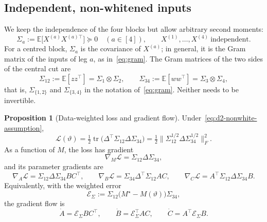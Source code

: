 \documentclass[11pt]{article}
\newcommand{\E}{\mathbb{E}}
\newcommand{\norm}[1]{\lVert #1\rVert}
\theoremstyle{definition}
\newtheorem{proposition}[theorem]{Proposition}
\numberwithin{equation}{section}
\begin{document}
\subsection{Independent, non-whitened inputs}\label{sec:d2-nonwhite}

We keep the independence of the four blocks but allow arbitrary second moments:
\begin{equation}\label{eq:d2-nonwhite-assumption}
\Sigma_a:=\E\big[X^{(a)}X^{(a)\top}\big]\succeq0\quad(a\in[4]),\qquad X^{(1)},\dots,X^{(4)}\ \text{independent}.
\end{equation}
For a centred block, $\Sigma_a$ is the covariance of $X^{(a)}$; in general, it is the Gram matrix of the inputs of leg $a$, as in~\eqref{eq:gram}. The Gram matrices of the two sides of the central cut are
\begin{equation}\label{eq:d2-gram-LR}
\Sigma_{12}:=\E[zz^\top]=\Sigma_1\otimes\Sigma_2,\qquad\Sigma_{34}:=\E[ww^\top]=\Sigma_3\otimes\Sigma_4,
\end{equation}
that is, $\Sigma_{\{1,2\}}$ and $\Sigma_{\{3,4\}}$ in the notation of~\eqref{eq:gram}. Neither needs to be invertible.

\begin{proposition}[Data-weighted loss and gradient flow]\label{prop:d2-nonwhite-flow}
Under~\eqref{eq:d2-nonwhite-assumption},
\begin{equation}\label{eq:d2-nonwhite-loss}
\mathcal L(\vartheta)=\tfrac12\operatorname{tr}\big(\Delta^\top\Sigma_{12}\Delta\Sigma_{34}\big)=\tfrac12\norm{\Sigma_{12}^{1/2}\Delta\Sigma_{34}^{1/2}}_F^2.
\end{equation}
As a function of $M$, the loss has gradient
\begin{equation}\label{eq:d2-coeff-gradient-nonwhite}
\nabla_M\mathcal L=\Sigma_{12}\Delta\Sigma_{34},
\end{equation}
and its parameter gradients are
\begin{equation}\label{eq:d2-nonwhite-gradients}
\nabla_A\mathcal L=\Sigma_{12}\Delta\Sigma_{34}BC^\top,\qquad\nabla_B\mathcal L=\Sigma_{34}\Delta^\top\Sigma_{12}AC,\qquad\nabla_C\mathcal L=A^\top\Sigma_{12}\Delta\Sigma_{34}B.
\end{equation}
Equivalently, with the weighted error
\begin{equation}\label{eq:d2-weighted-error}
\mathcal E_\Sigma:=\Sigma_{12}\big(M^\star-M(\vartheta)\big)\Sigma_{34},
\end{equation}
the gradient flow is
\begin{equation}\label{eq:d2-nonwhite-flow}
\dot A=\mathcal E_\Sigma BC^\top,\qquad\dot B=\mathcal E_\Sigma^\top AC,\qquad\dot C=A^\top\mathcal E_\Sigma B.
\end{equation}
\end{proposition}
\end{document}

